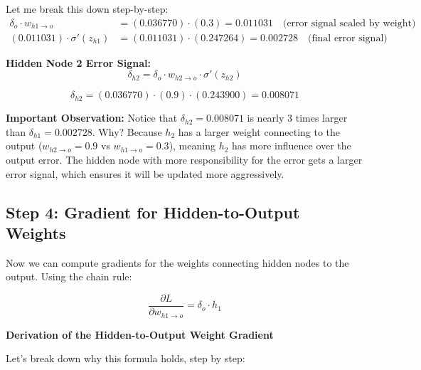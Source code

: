 \documentclass[12pt]{article}
\begin{document}
Let me break this down step-by-step:
\begin{align*}
\delta_o \cdot w_{h1 \to o} &= (0.036770) \cdot (0.3) = 0.011031 \quad \text{(error signal scaled by weight)} \\
(0.011031) \cdot \sigma'(z_{h1}) &= (0.011031) \cdot (0.247264) = 0.002728 \quad \text{(final error signal)}
\end{align*}

\noindent\textbf{Hidden Node 2 Error Signal:}
\[
\delta_{h2} = \delta_o \cdot w_{h2 \to o} \cdot \sigma'(z_{h2})
\]

\[
\delta_{h2} = (0.036770) \cdot (0.9) \cdot (0.243900) = 0.008071
\]

\vspace{0.2cm}

\noindent\textbf{Important Observation:} Notice that $\delta_{h2} = 0.008071$ is nearly 3 times larger than $\delta_{h1} = 0.002728$. Why? Because $h_2$ has a larger weight connecting to the output ($w_{h2 \to o} = 0.9$ vs $w_{h1 \to o} = 0.3$), meaning $h_2$ has more influence over the output error. The hidden node with more responsibility for the error gets a larger error signal, which ensures it will be updated more aggressively.

\subsection*{Step 4: Gradient for Hidden-to-Output Weights}

Now we can compute gradients for the weights connecting hidden nodes to the output. Using the chain rule:

\[
\frac{\partial L}{\partial w_{h1 \to o}} = \delta_o \cdot h_1
\]

\noindent\textbf{Derivation of the Hidden-to-Output Weight Gradient}

Let's break down why this formula holds, step by step:
\end{document}
